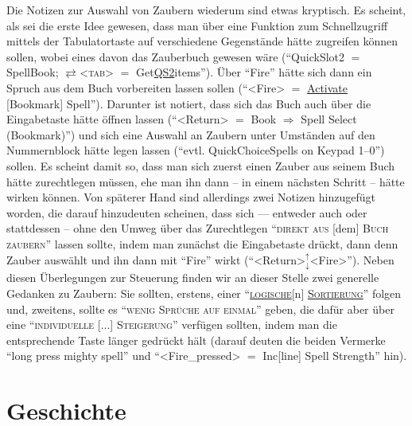 \documentclass[12pt]{scrbook}
\begin{document}
Die Notizen zur Auswahl von Zaubern wiederum sind etwas kryptisch.
Es scheint, als sei die erste Idee gewesen, dass man über eine Funktion zum Schnellzugriff mittels der Tabulatortaste auf verschiedene Gegenstände hätte zugreifen können sollen, wobei eines davon das Zauberbuch gewesen wäre (\enquote{QuickSlot2 $=$ SpellBook; $\rightleftarrows$<\textsc{tab}> $=$ Get\uline{QS2}items}).
Über \enquote{Fire} hätte sich dann ein Spruch aus dem Buch vorbereiten lassen sollen (\enquote{<Fire> $=$ \uline{Activate} [Bookmark] Spell}).
Darunter ist notiert, dass sich das Buch auch über die Eingabetaste hätte öffnen lassen (\enquote{<Return> $=$ Book $\Rightarrow$ Spell Select (Bookmark)}) und sich eine Auswahl an Zaubern unter Umständen auf den Nummernblock hätte legen lassen (\enquote{evtl. QuickChoiceSpells on Keypad 1--0}) sollen.
Es scheint damit so, dass man sich zuerst einen Zauber aus seinem Buch hätte zurechtlegen müssen, ehe man ihn dann -- in einem nächsten Schritt -- hätte wirken können.
Von späterer Hand sind allerdings zwei Notizen hinzugefügt worden, die darauf hinzudeuten scheinen, dass sich –– entweder auch oder stattdessen -- ohne den Umweg über das Zurechtlegen \enquote{\textsc{direkt aus} [dem] \textsc{Buch zaubern}} lassen sollte, indem man zunächst die Eingabetaste drückt, dann denn Zauber auswählt und ihn dann mit \enquote{Fire} wirkt (\enquote{<Return>$_{\downarrow}^{\uparrow}$<Fire>}).
Neben diesen Überlegungen zur Steuerung finden wir an dieser Stelle zwei generelle Gedanken zu Zaubern:
Sie sollten, erstens, einer \enquote{\textsc{\uline{logische}}[n] \textsc{\uline{Sortierung}}} folgen und, zweitens, sollte es \enquote{\textsc{wenig Sprüche auf einmal}} geben, die dafür aber über eine \enquote{\textsc{individuelle [...] Steigerung}} verfügen sollten, indem man die entsprechende Taste länger gedrückt hält (darauf deuten die beiden Vermerke \enquote{long press mighty spell} und \enquote{<Fire\_pressed> $=$ Inc[line] Spell Strength} hin).\autocite[S.~3]{orpheus_interface}


\section{Geschichte}\label{sec:orpheus_geschichte}


\clearpage
\appendix


\clearpage
\printbibliography
\end{document}
